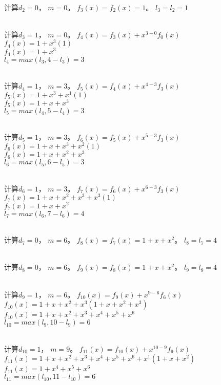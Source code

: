 \documentclass{article}
\begin{document}
~\\
计算$d_{2}={0}$，
$m=0$。
$f_{3}(x) = f_{2}(x) = 1 $。
$l_{3}=l_{2} = 1$

~\\
计算$d_{3}={1}$，
$m=0$。
$f_{4}(x) = f_{3}(x) + x^{3-0}f_{0}(x)$\\
$f_{4}(x) = 1  + x^{3}(1 )$\\
$f_{4}(x) = 1 + x^{3} $\\
$l_{4}=max(l_{3}, 4-l_{3})=3$

~\\
计算$d_{4}={1}$，
$m=3$。
$f_{5}(x) = f_{4}(x) + x^{4-3}f_{3}(x)$\\
$f_{5}(x) = 1 + x^{3}  + x^{1}(1 )$\\
$f_{5}(x) = 1 + x + x^{3} $\\
$l_{5}=max(l_{4}, 5-l_{4})=3$

~\\
计算$d_{5}={1}$，
$m=3$。
$f_{6}(x) = f_{5}(x) + x^{5-3}f_{3}(x)$\\
$f_{6}(x) = 1 + x + x^{3}  + x^{2}(1 )$\\
$f_{6}(x) = 1 + x + x^{2} + x^{3} $\\
$l_{6}=max(l_{5}, 6-l_{5})=3$

~\\
计算$d_{6}={1}$，
$m=3$。
$f_{7}(x) = f_{6}(x) + x^{6-3}f_{3}(x)$\\
$f_{7}(x) = 1 + x + x^{2} + x^{3}  + x^{3}(1 )$\\
$f_{7}(x) = 1 + x + x^{2} $\\
$l_{7}=max(l_{6}, 7-l_{6})=4$

~\\
计算$d_{7}={0}$，
$m=6$。
$f_{8}(x) = f_{7}(x) = 1 + x + x^{2} $。
$l_{8}=l_{7} = 4$

~\\
计算$d_{8}={0}$，
$m=6$。
$f_{9}(x) = f_{8}(x) = 1 + x + x^{2} $。
$l_{9}=l_{8} = 4$

~\\
计算$d_{9}={1}$，
$m=6$。
$f_{10}(x) = f_{9}(x) + x^{9-6}f_{6}(x)$\\
$f_{10}(x) = 1 + x + x^{2}  + x^{3}(1 + x + x^{2} + x^{3} )$\\
$f_{10}(x) = 1 + x + x^{2} + x^{3} + x^{4} + x^{5} + x^{6} $\\
$l_{10}=max(l_{9}, 10-l_{9})=6$

~\\
计算$d_{10}={1}$，
$m=9$。
$f_{11}(x) = f_{10}(x) + x^{10-9}f_{9}(x)$\\
$f_{11}(x) = 1 + x + x^{2} + x^{3} + x^{4} + x^{5} + x^{6}  + x^{1}(1 + x + x^{2} )$\\
$f_{11}(x) = 1 + x^{4} + x^{5} + x^{6} $\\
$l_{11}=max(l_{10}, 11-l_{10})=6$
\end{document}

